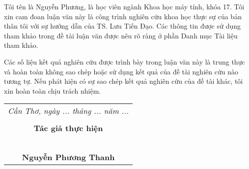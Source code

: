 \documentclass[./thesis.tex]{subfiles}
\begin{document}
{\fontsize{13}{12} \selectfont
Tôi tên là Nguyễn Phương, là học viên ngành Khoa học máy tính, khóa 17. Tôi xin cam đoan luận văn này là công trình nghiên cứu khoa học thực sự của bản thân tôi với sự hướng dẫn của TS. Lưu Tiến Đạo. Các thông tin được sử dụng tham khảo trong đề tài luận văn được nêu rõ ràng ở phần Danh mục Tài liệu tham khảo. 

Các số liệu kết quả nghiên cứu được trình bày trong luận văn này là trung thực và hoàn toàn không sao chép hoặc sử dụng kết quả của đề tài nghiên cứu nào tương tự. Nếu phát hiện có sự sao chép kết quả nghiên cứu của đề tài khác, tôi xin hoàn toàn chịu trách nhiệm.}


{\fontsize{13}{12} \selectfont
\hspace*{\fill}
\begin{tabular}{@{}c@{}} 

\\ \textit{Cần Thơ, ngày ... tháng ... năm ... } \\ \\
\textbf{Tác giả thực hiện}\\ \\
\\
\\
\\
\\
\textbf{Nguyễn Phương Thanh}
\end{tabular}}
\end{document}
